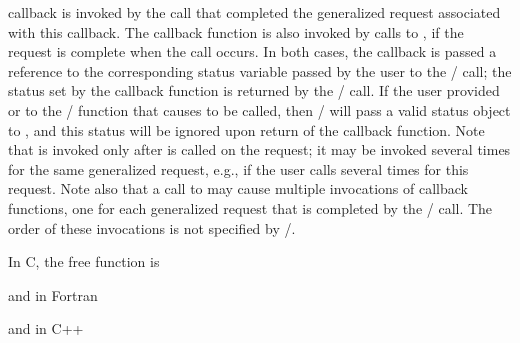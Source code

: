  callback is invoked by the 
% 
% 
% 
% 
% 
% 
 call that
completed the generalized request associated with this callback.  
The callback function
is also 
invoked by calls to , if the request is
complete when the call occurs.  In 
both
cases, the callback is passed a reference to the corresponding status variable
passed by the user to the \MPI/ call; the status set by the callback
function is returned by the \MPI/ call. 
If the user provided  or
 to the \MPI/ function that causes
 to be called, then \MPI/ will pass
a valid status object to , and this status will be
ignored upon return of the callback function.  
Note that 
is invoked only after 
 is called on the request; 
it may be invoked several times for
the same generalized request, e.g., if the user calls
 several times for this request.
Note also that a call to 
%
%
%
%
 may cause multiple
invocations of
 callback functions, one for each
generalized request that is completed by the \MPI/ call.  The order of
these invocations is not specified by \mpi/.

In C, the free function is
\medskip


\par\noindent
and in Fortran

\medskip


\par\noindent
and in C++

\medskip


